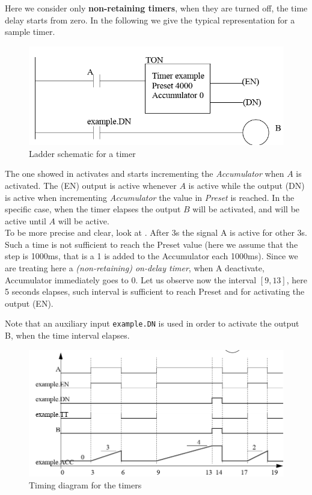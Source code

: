 Here we consider only \textbf{non-retaining timers}, when they are turned off, the time delay starts from zero. In the following we give the typical representation for a sample timer. 

\begin{figure}
    \centering
    \includegraphics[scale=0.7]{img/ladder_timers.png}
    \caption{Ladder schematic for a timer}
    \label{fig:timeron}
\end{figure}

The one showed in  activates and starts incrementing the \textit{Accumulator} when $A$ is activated. The (EN) output is active whenever $A$ is active while the output (DN) is active when incrementing \textit{Accumulator} the value in \textit{Preset} is reached. In the specific case, when the timer elapses the output $B$ will be activated, and will be active until $A$ will be active. \\
To be more precise and clear, look at . After 3s the signal A is active for other 3s. Such a time is not sufficient to reach the Preset value (here we assume that the step is 1000ms, that is a 1 is added to the Accumulator each 1000ms). Since we are treating here a \textit{(non-retaining) on-delay timer}, when A deactivate, Accumulator immediately goes to 0. Let us observe now the interval $[9,13]$, here 5 seconds elapses, such interval is sufficient to reach Preset and for activating the output (EN). 
\begin{remark}
    Note that an auxiliary input \texttt{example.DN} is used in order to activate the output B, when the time interval elapses.
\end{remark}

\begin{figure}
    \centering
    \includegraphics[scale=0.8]{img/timer_example.png}
    \caption{Timing diagram for the timers}
    \label{fig:timing_timer}
\end{figure}

